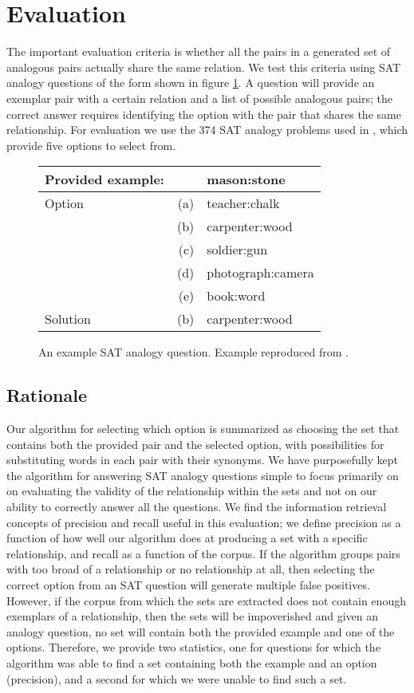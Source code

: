 \documentclass[11pt]{article}
\begin{document}
\section{Evaluation}

The important evaluation criteria is whether all the pairs in a generated set of
analogous pairs actually share the same relation.  We test this criteria using
SAT analogy questions of the form shown in figure \ref{fig:sat-question}.  A
question will provide an exemplar pair with a certain relation and a list of
possible analogous pairs; the correct answer requires identifying the option
with the pair that shares the same relationship.  For evaluation we use the 374
SAT analogy problems used in \cite{turney03combining}, which provide five
options to select from.  

\begin{figure}
  \begin{tabular}{lrl}
    \hline
    Provided example: & & mason:stone \\
    \hline
    Option & (a) & teacher:chalk \\
    & (b) & carpenter:wood  \\
    & (c) & soldier:gun \\
    & (d) & photograph:camera \\
    & (e) & book:word \\
    Solution & (b) & carpenter:wood  \\
    \hline
  \end{tabular}
  \caption{An example SAT analogy question.  Example reproduced from
    \cite{turney03combining}.}
  \label{fig:sat-question}
\end{figure}

\subsection{Rationale}

Our algorithm for selecting which option is summarized as choosing the set that
contains both the provided pair and the selected option, with possibilities for
substituting words in each pair with their synonyms.  We have purposefully kept
the algorithm for answering SAT analogy questions simple to focus primarily on
on evaluating the validity of the relationship within the sets and not on our
ability to correctly answer all the questions.  We find the information
retrieval concepts of precision and recall useful in this evaluation; we define
precision as a function of how well our algorithm does at producing a set with a
specific relationship, and recall as a function of the corpus.  If the algorithm
groups pairs with too broad of a relationship or no relationship at all, then
selecting the correct option from an SAT question will generate multiple false
positives.  However, if the corpus from which the sets are extracted does not
contain enough exemplars of a relationship, then the sets will be impoverished
and given an analogy question, no set will contain both the provided example and
one of the options.  Therefore, we provide two statistics, one for questions for
which the algorithm was able to find a set containing both the example and an
option (precision), and a second for which we were unable to find such a set.
\end{document}
